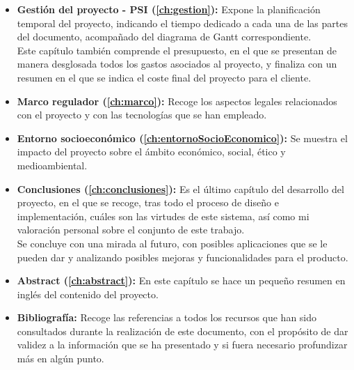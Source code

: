 \begin{itemize}
	\item \textbf{Gestión del proyecto - PSI (\autoref{ch:gestion}):} Expone la planificación temporal del proyecto, indicando el tiempo dedicado a cada una de las partes del documento, acompañado del diagrama de Gantt correspondiente. \\ Este capítulo también comprende el presupuesto, en el que se presentan de manera desglosada todos los gastos asociados al proyecto, y finaliza con un resumen en el que se indica el coste final del proyecto para el cliente.
	\item \textbf{Marco regulador (\autoref{ch:marco}):} Recoge los aspectos legales relacionados con el proyecto y con las tecnologías que se han empleado.
	\item \textbf{Entorno socioeconómico (\autoref{ch:entornoSocioEconomico}):} Se muestra el impacto del proyecto sobre el ámbito económico, social, ético y medioambiental.
	\item \textbf{Conclusiones (\autoref{ch:conclusiones}):} Es el último capítulo del desarrollo del proyecto, en el que se recoge, tras todo el proceso de diseño e implementación, cuáles son las virtudes de este sistema, así como mi valoración personal sobre el conjunto de este trabajo. \\ Se concluye con una mirada al futuro, con posibles aplicaciones que se le pueden dar y analizando posibles mejoras y funcionalidades para el producto.
	\item \textbf{Abstract (\autoref{ch:abstract}):} En este capítulo se hace un pequeño resumen en inglés del contenido del proyecto.
	\item \textbf{Bibliografía:} Recoge las referencias a todos los recursos que han sido consultados durante la realización de este documento, con el propósito de dar validez a la información que se ha presentado y si fuera necesario profundizar más en algún punto.
\end{itemize}